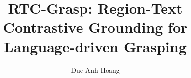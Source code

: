 \documentclass[10pt,twocolumn,letterpaper]{article}
\title{RTC-Grasp: Region-Text Contrastive Grounding for Language-driven Grasping}
\author{Duc Anh Hoang}
\begin{document}
\maketitle






{
    \footnotesize
    
    
}
\end{document}
